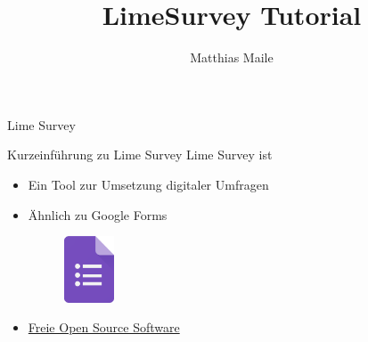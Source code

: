 \documentclass[aspectratio=1610, 9pt]{beamer}
\title{LimeSurvey Tutorial}
\author[M. Maile]{Matthias Maile}
\institute[S\&K]{Sprache und Kommunikation \\ Fakultät
Rehabilitationswissenschaften}
\begin{document}
\maketitle

\begin{frame}{Lime Survey}
  \tableofcontents
\end{frame}

\begin{frame}{Kurzeinführung zu Lime Survey}
	Lime Survey ist
  \begin{itemize}
    \item Ein Tool zur Umsetzung digitaler Umfragen
    \item Ähnlich zu Google Forms
    \begin{figure}
          \centering
    	\includegraphics[width=1.5cm]{images/forms-icon.png}
    \end{figure}
    \item \href{https://de.wikipedia.org/wiki/Free/Libre_Open_Source_Software}
	    {Freie Open Source Software}
  \end{itemize}
\end{frame}
\end{document}
